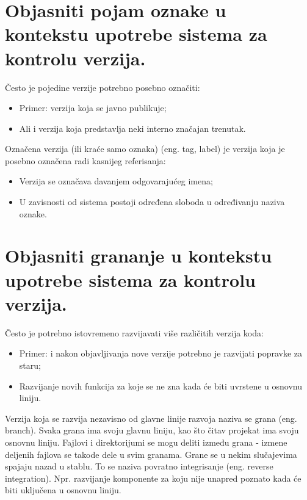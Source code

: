 \documentclass[a4paper]{article}
\begin{document}
\section{Objasniti pojam oznake u kontekstu upotrebe sistema za kontrolu verzija.}
  Često je pojedine verzije potrebno posebno označiti:
  \begin{itemize}
    \item Primer: verzija koja se javno publikuje;
    \item Ali i verzija koja predstavlja neki interno značajan trenutak.
  \end{itemize}
  Označena verzija (ili kraće samo oznaka) (eng. tag, label) je verzija koja je posebno 
  označena radi kasnijeg referisanja:
  \begin{itemize}
    \item Verzija se označava davanjem odgovarajućeg imena;
    \item U zavisnosti od sistema postoji određena sloboda u određivanju naziva oznake.
  \end{itemize}
  
\section{Objasniti grananje u kontekstu upotrebe sistema za kontrolu verzija.}
  Često je potrebno istovremeno razvijavati više različitih verzija koda:
  \begin{itemize}
    \item Primer: i nakon objavljivanja nove verzije potrebno je razvijati popravke za staru;
    \item Razvijanje novih funkcija za koje se ne zna kada će biti uvrstene u osnovnu liniju.
  \end{itemize}
  Verzija koja se razvija nezavisno od glavne linije razvoja naziva se grana (eng. branch). 
  Svaka grana ima svoju glavnu liniju, kao što čitav projekat ima svoju osnovnu liniju. 
  Fajlovi i direktorijumi se mogu deliti između grana - izmene deljenih fajlova se takode dele u 
  svim granama. Grane se u nekim slučajevima spajaju nazad u stablu. To se naziva povratno 
  integrisanje (eng. reverse integration). Npr. razvijanje komponente za koju nije unapred 
  poznato kada će biti uključena u osnovnu liniju.
\end{document}
